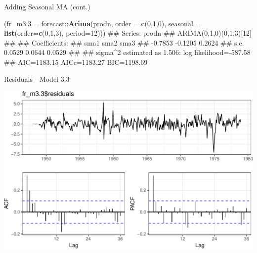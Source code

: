 \documentclass[11pt,ignorenonframetext,]{beamer}
\newenvironment{Shaded}{}{}
\newcommand{\DataTypeTok}[1]{\textcolor[rgb]{0.56,0.13,0.00}{#1}}
\newcommand{\DecValTok}[1]{\textcolor[rgb]{0.25,0.63,0.44}{#1}}
\newcommand{\KeywordTok}[1]{\textcolor[rgb]{0.00,0.44,0.13}{\textbf{#1}}}
\newcommand{\NormalTok}[1]{#1}
\newcommand{\OperatorTok}[1]{\textcolor[rgb]{0.40,0.40,0.40}{#1}}
\let\oldShaded\Shaded
\let\endoldShaded\endShaded
\renewenvironment{Shaded}{\footnotesize\begin{spacing}{0.9}\oldShaded}{\endoldShaded\end{spacing}}
\let\oldverbatim\verbatim
\let\endoldverbatim\endverbatim
\newcommand{\scriptoutput}{
  \renewenvironment{Shaded}{\scriptsize\begin{spacing}{0.9}\oldShaded}{\endoldShaded\end{spacing}}
  \renewenvironment{verbatim}{\scriptsize\begin{spacing}{0.9}\oldverbatim}{\endoldverbatim\end{spacing}}
}
\begin{document}
\begin{frame}[fragile,t]{%
\protect\hypertarget{adding-seasonal-ma-cont.}{%
Adding Seasonal MA (cont.)}}

\scriptoutput

\begin{Shaded}
\begin{Highlighting}[]
\NormalTok{(}\DataTypeTok{fr_m3.3 =}\NormalTok{ forecast}\OperatorTok{::}\KeywordTok{Arima}\NormalTok{(prodn, }\DataTypeTok{order =} \KeywordTok{c}\NormalTok{(}\DecValTok{0}\NormalTok{,}\DecValTok{1}\NormalTok{,}\DecValTok{0}\NormalTok{), }
            \DataTypeTok{seasonal =} \KeywordTok{list}\NormalTok{(}\DataTypeTok{order=}\KeywordTok{c}\NormalTok{(}\DecValTok{0}\NormalTok{,}\DecValTok{1}\NormalTok{,}\DecValTok{3}\NormalTok{), }\DataTypeTok{period=}\DecValTok{12}\NormalTok{)))}
\NormalTok{## Series: prodn }
\NormalTok{## ARIMA(0,1,0)(0,1,3)[12] }
\NormalTok{## }
\NormalTok{## Coefficients:}
\NormalTok{##          sma1     sma2    sma3}
\NormalTok{##       -0.7853  -0.1205  0.2624}
\NormalTok{## s.e.   0.0529   0.0644  0.0529}
\NormalTok{## }
\NormalTok{## sigma^2 estimated as 1.506:  log likelihood=-587.58}
\NormalTok{## AIC=1183.15   AICc=1183.27   BIC=1198.69}
\end{Highlighting}
\end{Shaded}

\end{frame}

\begin{frame}{%
\protect\hypertarget{residuals---model-3.3}{%
Residuals - Model 3.3}}

\begin{center}\includegraphics[width=\textwidth]{Lec11_files/figure-beamer/unnamed-chunk-23-1} \end{center}

\end{frame}
\end{document}
